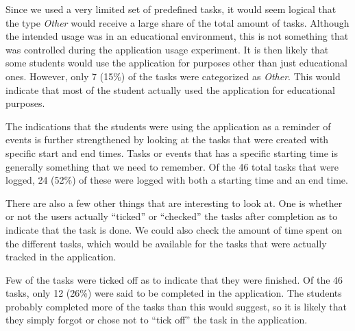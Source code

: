 Since we used a very limited set of predefined tasks, it would seem logical that the type \emph{Other} would receive a large share of the total amount of tasks. Although the intended usage was in an educational environment, this is not something that was controlled during the application usage experiment. It is then likely that some students would use the application for purposes other than just educational ones. However, only 7 (15\%) of the tasks were categorized as \emph{Other}. This would indicate that most of the student actually used the application for educational purposes.

The indications that the students were using the application as a reminder of events is further strengthened by looking at the tasks that were created with specific start and end times. Tasks or events that has a specific starting time is generally something that we need to remember. Of the 46 total tasks that were logged, 24 (52\%) of these were logged with both a starting time and an end time.

There are also a few other things that are interesting to look at. One is whether or not the users actually ``ticked'' or ``checked'' the tasks after completion as to indicate that the task is done. We could also check the amount of time spent on the different tasks, which would be available for the tasks that were actually tracked in the application.

Few of the tasks were ticked off as to indicate that they were finished. Of the 46 tasks, only 12 (26\%) were said to be completed in the application. The students probably completed more of the tasks than this would suggest, so it is likely that they simply forgot or chose not to ``tick off'' the task in the application.

